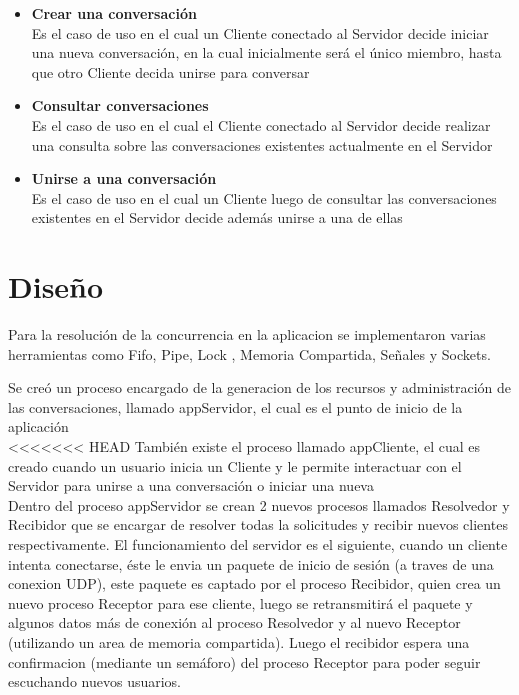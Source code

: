 \documentclass[a4paper,12pt,titlepage]{article}
\begin{document}
\begin{itemize}
\item \textbf{Crear una conversación}\\ 
  Es el caso de uso en el cual un Cliente conectado al Servidor decide iniciar una nueva conversación, en la cual inicialmente
  será el único miembro, hasta que otro Cliente decida unirse para conversar
\item \textbf{Consultar conversaciones}\\
  Es el caso de uso en el cual el Cliente conectado al Servidor decide realizar una consulta sobre las conversaciones
  existentes actualmente en el Servidor
\item \textbf{Unirse a una conversación}\\
  Es el caso de uso en el cual un Cliente luego de consultar las conversaciones existentes en el Servidor decide además
  unirse a una de ellas\\
\end{itemize} 


\newpage
\section{Diseño}

Para la resolución de la concurrencia en la aplicacion se implementaron varias herramientas como Fifo, Pipe, Lock , 
Memoria Compartida, Señales y Sockets.

Se creó un proceso encargado de la generacion de los recursos y administración de las conversaciones, llamado 
appServidor, el cual es el punto de inicio de la aplicación\\

<<<<<<< HEAD
También existe el proceso llamado appCliente, el cual es creado cuando un usuario inicia un Cliente y le permite interactuar con
el Servidor para unirse a una conversación o iniciar una nueva\\

Dentro del proceso appServidor se crean 2 nuevos procesos llamados Resolvedor y Recibidor que se encargar de resolver todas la solicitudes 
y recibir nuevos clientes respectivamente.
El funcionamiento del servidor es el siguiente, cuando un cliente intenta conectarse, éste le envia un paquete de inicio de sesión (a traves 
de una conexion UDP), este paquete es captado por el proceso Recibidor, quien crea un nuevo proceso Receptor para ese cliente, luego 
se retransmitirá el paquete y algunos datos más de conexión al proceso Resolvedor y al nuevo Receptor (utilizando un area de memoria compartida). 
Luego el recibidor espera una confirmacion (mediante un semáforo) del proceso Receptor para poder seguir escuchando nuevos usuarios.\\
\end{document}
